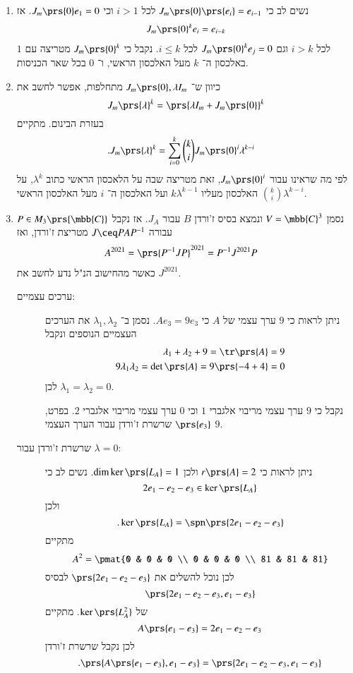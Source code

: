 \documentclass[a4paper,10pt,oneside,openany]{article}
\begin{document}
\begin{solution}
\begin{enumerate}
\item%
נשים לב כי
$J_{m}\prs{0}\prs{e_i} = e_{i-1}$
לכל
$i > 1$
וכי
$J_m\prs{0} e_1 = 0$.
אז
\begin{align*}
J_m\prs{0}^k e_i = e_{i-k}
\end{align*}
לכל
$i > k$
וגם
$J_m\prs{0}^k e_j = 0$
לכל
$i \leq k$.
נקבל כי
$J_m\prs{0}^k$
מטריצה עם
$1$
באלכסון ה־%
$k$
מעל האלכסון הראשי, ו־%
$0$
בכל שאר הכניסות.
\item%
כיוון ש־%
$J_m\prs{0}, \lambda I_m$
מתחלפות, אפשר לחשב את
\[J_m\prs{\lambda}^k = \prs{\lambda I_m + J_m\prs{0}}^k\]
בעזרת הבינום.
מתקיים
\begin{align*}
\text{.} J_m\prs{\lambda}^k &= \sum_{i = 0}^{k} \binom{k}{i} J_m\prs{0}^i \lambda^{k-i}
\end{align*}
לפי מה שראינו עבור
$J_m\prs{0}^i$,
זאת מטריצה שבה על הלאכסון הראשי כתוב
$\lambda^k$,
על האלכסון מעליו
$k \lambda^{k-1}$
ועל האלכסון ה־%
$i$
מעל האלכסון הראשי
$\binom{k}{i} \lambda^{k-i}$.
\item%
נסמן
$V = \mbb{C}^3$
ונמצא בסיס ז'ורדן
$B$
עבור
$J_A$.
אז נקבל
$P \in M_3\prs{\mbb{C}}$
עבורה
$J \ceq P A P^{-1}$
מטריצת ז'ורדן, ואז
\begin{align*}
A^{2021} &= \prs{P^{-1}JP}^{2021}
= P^{-1}J^{2021}P
\end{align*}
כאשר מהחישוב הנ"ל נדע לחשב את
$J^{2021}$.

\begin{description}
\item[ערכים עצמיים:]
ניתן לראות כי
$9$
ערך עצמי של
$A$
כי
$A e_3 = 9 e_3$.
נסמן ב־%
$\lambda_1, \lambda_2$
את הערכים העצמיים הנוספים ונקבל
\begin{align*}
\lambda_1 + \lambda_2 + 9 = \tr\prs{A} = 9 \\
9 \lambda_1 \lambda_2 = \det\prs{A} = 9\prs{-4+4} = 0
\end{align*}
לכן
$\lambda_1 = \lambda_2 = 0$.

נקבל כי
$9$
ערך עצמי מריבוי אלגברי
$1$
וכי
$0$
ערך עצמי מריבוי אלגברי
$2$.
בפרט,
$\prs{e_3}$
שרשרת ז'ורדן עבור הערך העצמי
$9$.
\item[שרשרת ז'ורדן עבור
$\lambda = 0$:]
ניתן לראות כי
$r\prs{A} = 2$
ולכן
$\dim \ker \prs{L_A} = 1$.
נשים לב כי
\[2 e_1 - e_2 - e_3 \in \ker\prs{L_A}\]
ולכן
\[\text{.} \ker\prs{L_A} = \spn\prs{2 e_1 - e_2 - e_3}\]
מתקיים
\[A^2 = \pmat{0 & 0 & 0 \\ 0 & 0 & 0 \\ 81 & 81 & 81}\]
לכן נוכל להשלים את
$\prs{2 e_1 - e_2 - e_3}$
לבסיס
\[\prs{2 e_1 - e_2 - e_3, e_1 - e_3}\]
של
$\ker\prs{L_A^2}$.
מתקיים
\[A \prs{e_1 - e_3} = 2e_1 - e_2 - e_3\]
לכן נקבל שרשרת ז'ורדן
\[\text{.} \prs{A\prs{e_1 - e_3}, e_1 - e_3} = \prs{2e_1 - e_2 - e_3, e_1 - e_3}\]


\end{description}
\end{enumerate}
\end{solution}
\end{document}
